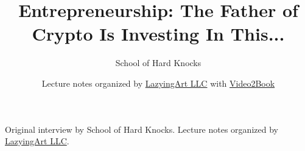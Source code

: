 \documentclass[11pt,oneside]{book}
\begin{document}
\frontmatter
\title{Entrepreneurship: The Father of Crypto Is Investing In This...}
\author{School of Hard Knocks}
\date{Lecture notes organized by \href{https://lazying.art}{LazyingArt LLC} with \href{https://github.com/lachlanchen/Video2Book}{Video2Book}}
\maketitle
\begin{center}
\small Original interview by School of Hard Knocks. Lecture notes organized by \href{https://lazying.art}{LazyingArt LLC}.
\end{center}
\clearpage
\mainmatter

\end{document}
